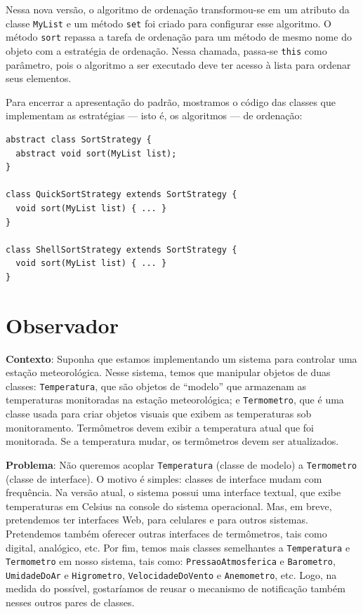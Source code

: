 \documentclass[
  11pt,
  twoside]{book}
\newcommand{\passthrough}[1]{#1}
\begin{document}
Nessa nova versão, o algoritmo de ordenação transformou-se em um
atributo da classe \passthrough{\lstinline!MyList!} e um método
\passthrough{\lstinline!set!} foi criado para configurar esse algoritmo.
O método \passthrough{\lstinline!sort!} repassa a tarefa de ordenação
para um método de mesmo nome do objeto com a estratégia de ordenação.
Nessa chamada, passa-se \passthrough{\lstinline!this!} como parâmetro,
pois o algoritmo a ser executado deve ter acesso à lista para ordenar
seus elementos.

Para encerrar a apresentação do padrão, mostramos o código das classes
que implementam as estratégias --- isto é, os algoritmos --- de
ordenação:

\begin{lstlisting}
abstract class SortStrategy {
  abstract void sort(MyList list);
}

class QuickSortStrategy extends SortStrategy {
  void sort(MyList list) { ... }
}

class ShellSortStrategy extends SortStrategy {
  void sort(MyList list) { ... }
}
\end{lstlisting}

\hypertarget{observador}{%
\section{Observador}\label{observador}}

 

\textbf{Contexto}: Suponha que estamos implementando um sistema para
controlar uma estação meteorológica. Nesse sistema, temos que manipular
objetos de duas classes: \passthrough{\lstinline!Temperatura!}, que são
objetos de ``modelo'' que armazenam as temperaturas monitoradas na
estação meteorológica; e \passthrough{\lstinline!Termometro!}, que é uma
classe usada para criar objetos visuais que exibem as temperaturas sob
monitoramento. Termômetros devem exibir a temperatura atual que foi
monitorada. Se a temperatura mudar, os termômetros devem ser
atualizados.

\textbf{Problema}: Não queremos acoplar
\passthrough{\lstinline!Temperatura!} (classe de modelo) a
\passthrough{\lstinline!Termometro!} (classe de interface). O motivo é
simples: classes de interface mudam com frequência. Na versão atual, o
sistema possui uma interface textual, que exibe temperaturas em Celsius
na console do sistema operacional. Mas, em breve, pretendemos ter
interfaces Web, para celulares e para outros sistemas. Pretendemos
também oferecer outras interfaces de termômetros, tais como digital,
analógico, etc. Por fim, temos mais classes semelhantes a
\passthrough{\lstinline!Temperatura!} e
\passthrough{\lstinline!Termometro!} em nosso sistema, tais como:
\passthrough{\lstinline!PressaoAtmosferica!} e
\passthrough{\lstinline!Barometro!},
\passthrough{\lstinline!UmidadeDoAr!} e
\passthrough{\lstinline!Higrometro!},
\passthrough{\lstinline!VelocidadeDoVento!} e
\passthrough{\lstinline!Anemometro!}, etc. Logo, na medida do possível,
gostaríamos de reusar o mecanismo de notificação também nesses outros
pares de classes.
\end{document}
